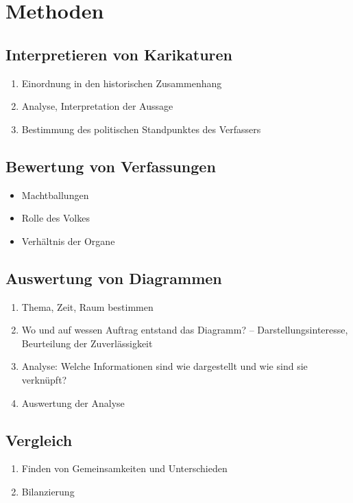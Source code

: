 \chapter{Methoden}

\section{Interpretieren von Karikaturen}

\begin{enumerate}
\item Einordnung in den historischen Zusammenhang
\item Analyse, Interpretation der Aussage
\item Bestimmung des politischen Standpunktes des Verfassers  
\end{enumerate}


\section{Bewertung von Verfassungen}

\begin{itemize}
\item Machtballungen
\item Rolle des Volkes
\item Verhältnis der Organe 
\end{itemize}


\section{Auswertung von Diagrammen}

\begin{enumerate}
\item Thema, Zeit, Raum bestimmen
\item Wo und auf wessen Auftrag entstand das Diagramm? --
Darstellungsinteresse, Beurteilung der Zuverlässigkeit
\item Analyse: Welche Informationen sind wie dargestellt und wie sind
sie verknüpft?
\item Auswertung der Analyse
\end{enumerate}


\section{Vergleich}

\begin{enumerate}
\item Finden von Gemeinsamkeiten und Unterschieden 
\item Bilanzierung
\end{enumerate}



\endinput
